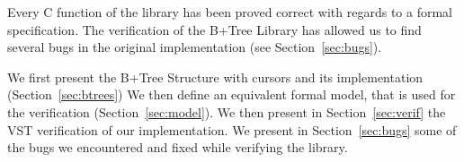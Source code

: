   Every C function of the library has been proved correct with regards to a formal specification.
  The verification of the B+Tree Library has allowed us to find several bugs in the original implementation (see Section~\ref{sec:bugs}).

  We first present the B+Tree Structure with cursors and its implementation (Section~\ref{sec:btrees})
  We then define an equivalent formal model, that is used for the verification (Section~\ref{sec:model}).
  We then present in Section~\ref{sec:verif} the VST verification of our implementation.
  We present in Section~\ref{sec:bugs} some of the bugs we encountered and fixed while verifying the library.
